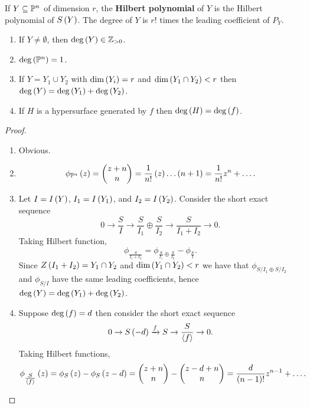 \pagebreak

\begin{definition}
If $ Y \subseteq \P^n $ of dimension $ r $, the \textbf{Hilbert polynomial} of $ Y $ is the Hilbert polynomial of $ S\br{Y} $. The degree of $ Y $ is $ r! $ times the leading coefficient of $ P_Y $.
\end{definition}

\begin{theorem}
\hfill
\begin{enumerate}
\item If $ Y \ne \emptyset $, then $ \deg\br{Y} \in \Z_{> 0} $.
\item $ \deg\br{\P^n} = 1 $.
\item If $ Y = Y_1 \cup Y_2 $ with $ \dim\br{Y_i} = r $ and $ \dim\br{Y_1 \cap Y_2} < r $ then $ \deg\br{Y} = \deg\br{Y_1} + \deg\br{Y_2} $.
\item If $ H $ is a hypersurface generated by $ f $ then $ \deg\br{H} = \deg\br{f} $.
\end{enumerate}
\end{theorem}

\begin{proof}
\hfill
\begin{enumerate}
\item Obvious.
\item
$$ \phi_{\P^n}\br{z} = \twobyone{z + n}{n} = \dfrac{1}{n!}\br{z} \dots \br{n + 1} = \dfrac{1}{n!}z^n + \dots. $$
\item Let $ I = I\br{Y} $, $ I_1 = I\br{Y_1} $, and $ I_2 = I\br{Y_2} $. Consider the short exact sequence
$$ 0 \to \dfrac{S}{I} \to \dfrac{S}{I_1} \oplus \dfrac{S}{I_2} \to \dfrac{S}{I_1 + I_2} \to 0. $$
Taking Hilbert function,
$$ \phi_{\tfrac{S}{I_1 + I_2}} = \phi_{\tfrac{S}{I_1} \oplus \tfrac{S}{I_2}} - \phi_{\tfrac{S}{I}}. $$
Since $ Z\br{I_1 + I_2} = Y_1 \cap Y_2 $ and $ \dim\br{Y_1 \cap Y_2} < r $ we have that $ \phi_{S / I_1 \oplus S / I_2} $ and $ \phi_{S / I} $ have the same leading coefficients, hence $ \deg\br{Y} = \deg\br{Y_1} + \deg\br{Y_2} $.
\item Suppose $ \deg\br{f} = d $ then consider the short exact sequence
$$ 0 \to S\br{-d} \xrightarrow{f}{S} \to \dfrac{S}{\abr{f}} \to 0. $$
Taking Hilbert functions,
$$ \phi_{\tfrac{S}{\abr{f}}}\br{z} = \phi_S\br{z} - \phi_S\br{z - d} = \twobyone{z + n}{n} - \twobyone{z - d + n}{n} = \dfrac{d}{\br{n - 1}!}z^{n - 1} + \dots. $$
\end{enumerate}
\end{proof}

